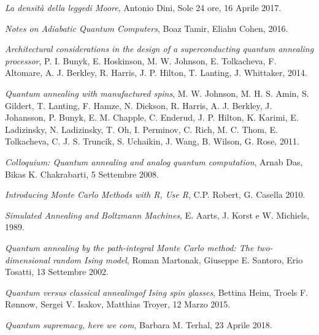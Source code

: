 \newpage
\begin{thebibliography}{99}

    \textit{La densità della leggedi Moore},
    Antonio Dini,
    Sole 24 ore,
    16 Aprile 2017.

    \textit{Notes on Adiabatic Quantum Computers},
    Boaz Tamir, Eliahu Cohen,
    2016.

    \textit{Architectural considerations in the design of a superconducting quantum annealing processor},
    P. I. Bunyk, E. Hoskinson, M. W. Johnson, E. Tolkacheva, F. Altomare, A. J. Berkley, R. Harris, J. P. Hilton, T. Lanting, J. Whittaker,
    2014.

    \textit{Quantum annealing with manufactured spins},
    M. W. Johnson, M. H. S. Amin, S. Gildert, T. Lanting, F. Hamze, N. Dickson, R. Harris, A. J. Berkley, J. Johansson, P. Bunyk, E. M. Chapple, C. Enderud, J. P. Hilton, K. Karimi, E. Ladizinsky, N. Ladizinsky, T. Oh, I. Perminov, C. Rich, M. C. Thom, E. Tolkacheva, C. J. S. Truncik, S. Uchaikin, J. Wang, B. Wilson, G. Rose,
    2011.




    \textit{Colloquium: Quantum annealing and analog quantum computation},
    Arnab Das, Bikas K. Chakrabarti,
    5 Settembre 2008.

    \textit{Introducing Monte Carlo Methods with R, Use R},
    C.P. Robert, G. Casella
    2010.

    \textit{Simulated Annealing and Boltzmann Machines},
    E. Aarts, J. Korst e W. Michiels,
    1989.

    \textit{Quantum annealing by the path-integral Monte Carlo method: The two-dimensional random Ising model},
    Roman Martonak, Giuseppe E. Santoro, Erio Tosatti,
    13 Settembre 2002.

    \textit{Quantum versus classical annealingof Ising spin glasses},
    Bettina Heim, Troels F. Rønnow, Sergei V. Isakov, Matthias Troyer,
    12 Marzo 2015.

    \textit{Quantum supremacy, here we com},
    Barbara M. Terhal,
    23 Aprile 2018.


\end{thebibliography}
